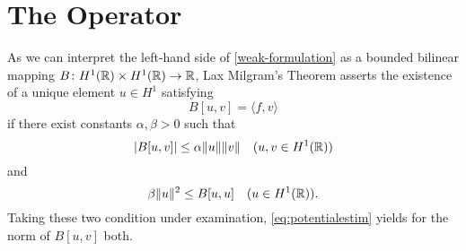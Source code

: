 \chapter{The Operator}

As we can interpret the left-hand side of \eqref{weak-formulation} as a bounded bilinear mapping $B \colon H^{1}(\mathbb{R}) \times H^{1}(\mathbb{R}) \rightarrow \mathbb{R}$, Lax Milgram's Theorem asserts the existence of a unique element $u \in H^{1}$ satisfying
\begin{equation*}
	B[u, v] = \langle f, v \rangle
\end{equation*}
if there exist constants $\alpha, \beta > 0$ such that
	\[ \left| B[u,v] \right| \leq \alpha \|u\| \|v\| \quad (u, v \in H^{1}(\mathbb{R})) \]
and
	\[ \beta \|u\|^{2} \leq B[u, u] \quad (u \in H^{1}(\mathbb{R})). \]
Taking these two condition under examination, \eqref{eq:potentialestim} yields for the norm of $B[u, v]$ both. \newpage %

